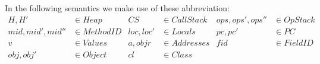 In the following semantics we make use of these abbreviation:
\begin{subequations}
\begin{align*}
H, H' &\in Heap  & CS &\in CallStack & ops, ops', ops'' &\in OpStack\\
mid, mid', mid'' &\in MethodID & loc, loc' &\in Locals & pc, pc' &\in PC\\
v &\in Values & a, objr &\in Addresses & fid &\in FieldID \\
obj, obj' &\in Object & cl &\in Class
\end{align*}
\end{subequations}